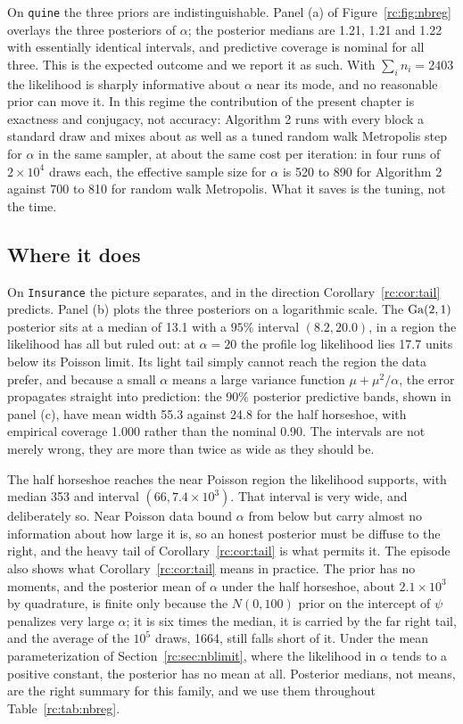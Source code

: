 On \texttt{quine} the three priors are indistinguishable. Panel (a) of Figure~\ref{rc:fig:nbreg} overlays the three posteriors of $\alpha$; the posterior medians are 1.21, 1.21 and 1.22 with essentially identical intervals, and predictive coverage is nominal for all three. This is the expected outcome and we report it as such. With $\sum_in_i=2403$ the likelihood is sharply informative about $\alpha$ near its mode, and no reasonable prior can move it. In this regime the contribution of the present chapter is exactness and conjugacy, not accuracy: Algorithm 2 runs with every block a standard draw and mixes about as well as a tuned random walk Metropolis step for $\alpha$ in the same sampler, at about the same cost per iteration: in four runs of $2\times10^4$ draws each, the effective sample size for $\alpha$ is 520 to 890 for Algorithm 2 against 700 to 810 for random walk Metropolis. What it saves is the tuning, not the time.

\subsection{Where it does}

On \texttt{Insurance} the picture separates, and in the direction Corollary~\ref{rc:cor:tail} predicts. Panel (b) plots the three posteriors on a logarithmic scale. The $\mathrm{Ga}(2,1)$ posterior sits at a median of 13.1 with a $95\%$ interval $(8.2,20.0)$, in a region the likelihood has all but ruled out: at $\alpha=20$ the profile log likelihood lies 17.7 units below its Poisson limit. Its light tail simply cannot reach the region the data prefer, and because a small $\alpha$ means a large variance function $\mu+\mu^2/\alpha$, the error propagates straight into prediction: the $90\%$ posterior predictive bands, shown in panel (c), have mean width 55.3 against 24.8 for the half horseshoe, with empirical coverage 1.000 rather than the nominal 0.90. The intervals are not merely wrong, they are more than twice as wide as they should be.

The half horseshoe reaches the near Poisson region the likelihood supports, with median 353 and interval $(66,7.4\times10^3)$. That interval is very wide, and deliberately so. Near Poisson data bound $\alpha$ from below but carry almost no information about how large it is, so an honest posterior must be diffuse to the right, and the heavy tail of Corollary~\ref{rc:cor:tail} is what permits it. The episode also shows what Corollary~\ref{rc:cor:tail} means in practice. The prior has no moments, and the posterior mean of $\alpha$ under the half horseshoe, about $2.1\times10^3$ by quadrature, is finite only because the $N(0,100)$ prior on the intercept of $\psi$ penalizes very large $\alpha$; it is six times the median, it is carried by the far right tail, and the average of the $10^5$ draws, 1664, still falls short of it. Under the mean parameterization of Section~\ref{rc:sec:nblimit}, where the likelihood in $\alpha$ tends to a positive constant, the posterior has no mean at all. Posterior medians, not means, are the right summary for this family, and we use them throughout Table~\ref{rc:tab:nbreg}.

